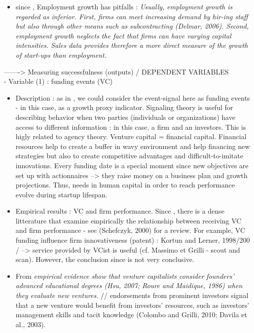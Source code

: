 \begin{itemize}
\begin{itemize}
\begin{itemize}
  \item since \citet{grillitsch2020does}, Employment growth has pitfalls : \textit{Usually, employment growth is regarded as inferior. First, firms can meet increasing demand by hir-ing staff but also through other means such as subcontracting (Delmar, 2006). Second, employment growth neglects the fact that firms can have varying capital intensities. Sales data provides therefore a more direct measure of the growth of start-ups than employment.}
\end{itemize}

-------> Measuring successfulness (outputs) / DEPENDENT VARIABLES\\

- Variable (1) : funding events (VC)
\begin{itemize}
  \item Description : as in \citep{davila2003venture}, we could consider the event-signal here as funding events - in this case, as a growth proxy indicator. Signaling theory is useful for describing behavior when two parties (individuals or organizations) have access to different information : in this case, a firm and an investors. This is higly related to agency theory. Venture capital = financial capital. Financial resources help to create a buffer in wavy environment and help financing new strategies but also to create competitive advantages and difficult-to-imitate innovations. Every funding date is a special moment since new objectives are set up with actionnaires --> they raise money on a business plan and growth projections. Thus, needs in human capital in order to reach performance evolve during startup lifespan.
  \item Empirical results : VC and firm performance. Since \citep{engel2007firm}, there is a dense litterature that examine empirically the relationship between receiving VC and firm performance - see (Schefczyk, 2000) for a review. For example, VC funding influence firm innovativeness (patent) : Kortun and Lerner, 1998/200 / --> service provided by VCist is useful (cf. Massimo et Grilli - scout and scan). However, the conclusion since \citep{engel2007firm} is not very conclusive.
  \item From \citep{ko2018signaling} \textit{empirical evidence show that venture capitalists consider founders' advanced educational degrees (Hsu, 2007; Roure and Maidique, 1986) when they evaluate new ventures.} // endorsements from prominent investors signal that a new venture would benefit from investors' resources, such as investors' management skills and tacit knowledge (Colombo and Grilli, 2010; Davila et al., 2003).

\end{itemize}
\end{itemize}
\end{itemize}
